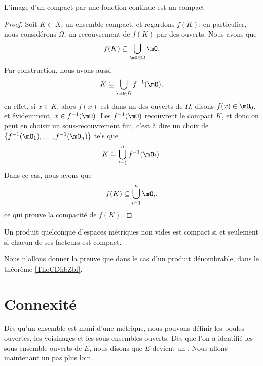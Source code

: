 \begin{theorem}     \label{ThoImCompCotComp}
L'image d'un compact par une fonction continue est un compact
\end{theorem}

\begin{proof}
    Soit $K\subset X$, un ensemble compact, et regardons $f(K)$; en particulier, nous considérons $\Omega$, un recouvrement de $f(K)$ par des ouverts. Nous avons que
    \begin{equation}
        f(K)\subseteq\bigcup_{\mO\in\Omega}\mO.
    \end{equation}
    Par construction, nous avons aussi
    \begin{equation}
        K\subseteq\bigcup_{\mO\in\Omega}f^{-1}(\mO),
    \end{equation}
    en effet, si $x\in K$, alors $f(x)$ est dans un des ouverts de $\Omega$, disons $f(x)\in \mO_0$, et évidemment, $x\in f^{-1}(\mO)$.  Les $f^{-1}(\mO)$ recouvrent le compact $K$, et donc on peut en choisir un sous-recouvrement fini, c'est à dire un choix de $\{ f^{-1}(\mO_1),\ldots,f^{-1}(\mO_n) \}$ tels que
    \begin{equation}
        K\subseteq \bigcup_{i=1}^nf^{-1}(\mO_i).
    \end{equation}
    Dans ce cas, nous avons que
    \begin{equation}
        f(K)\subseteq\bigcup_{i=1}^n\mO_i,
    \end{equation}
    ce qui prouve la compacité de $f(K)$.
\end{proof}

\begin{theorem}[Tykhonov]\label{ThoFWXsQOZ}
    Un produit quelconque d'espaces métriques non vides est compact si et seulement si chacun de ses facteurs est compact.
\end{theorem}
Nous n'allons donner la preuve que dans le cas d'un produit dénombrable, dans le théorème \ref{ThoCDhbZbf}.

\section{Connexité}

Dès qu'un ensemble est muni d'une métrique, nous pouvons définir les boules ouvertes, les voisinages et les sous-ensembles ouverts. Dès que l'on a identifié les sous-ensemble ouverts de $E$, nous disons que $E$ devient un . Nous allons maintenant un pas plus loin.

